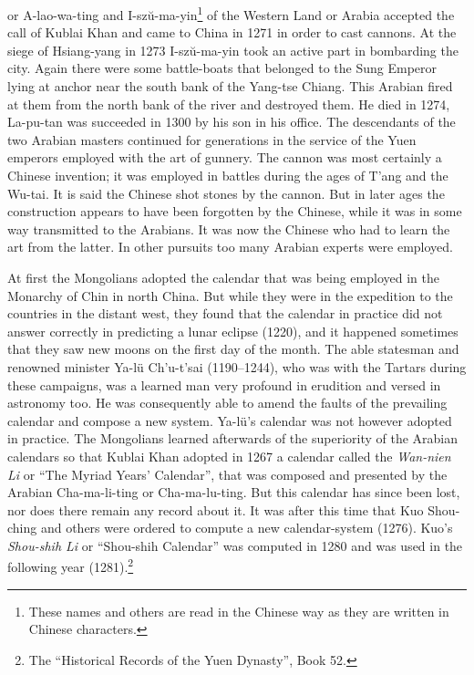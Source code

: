 \documentclass[11pt]{article}
\newcommand{\scanpage}[2]{\clearpage\setcounter{footnote}{0}\noindent{\footnotesize\color{gray}PDF page #1 · #2}\par\medskip}
\begin{document}
\scanpage{0114}{Chapter 15, printed page 100}
\setcounter{footnote}{0}
or A-lao-wa-ting and I-szŭ-ma-yin\footnote{These names and others are read in the Chinese way as they are written in Chinese characters.} of the Western Land or Arabia accepted the call of Kublai Khan and came to China in 1271 in order to cast cannons. At the siege of Hsiang-yang in 1273 I-szŭ-ma-yin took an active part in bombarding the city. Again there were some battle-boats that belonged to the Sung Emperor lying at anchor near the south bank of the Yang-tse Chiang. This Arabian fired at them from the north bank of the river and destroyed them. He died in 1274, La-pu-tan was succeeded in 1300 by his son in his office. The descendants of the two Arabian masters continued for generations in the service of the Yuen emperors employed with the art of gunnery. The cannon was most certainly a Chinese invention; it was employed in battles during the ages of T'ang and the Wu-tai. It is said the Chinese shot stones by the cannon. But in later ages the construction appears to have been forgotten by the Chinese, while it was in some way transmitted to the Arabians. It was now the Chinese who had to learn the art from the latter. In other pursuits too many Arabian experts were employed.

At first the Mongolians adopted the calendar that was being employed in the Monarchy of Chin in north China. But while they were in the expedition to the countries in the distant west, they found that the calendar in practice did not answer correctly in predicting a lunar eclipse (1220), and it happened sometimes that they saw new moons on the first day of the month. The able statesman and renowned minister Ya-lü Ch'u-t'sai (1190--1244), who was with the Tartars during these campaigns, was a learned man very profound in erudition and versed in astronomy too. He was consequently able to amend the faults of the prevailing calendar and compose a new system. Ya-lü's calendar was not however adopted in practice. The Mongolians learned afterwards of the superiority of the Arabian calendars so that Kublai Khan adopted in 1267 a calendar called the \emph{Wan-nien Li} or ``The Myriad Years' Calendar'', that was composed and presented by the Arabian Cha-ma-li-ting or Cha-ma-lu-ting. But this calendar has since been lost, nor does there remain any record about it. It was after this time that Kuo Shou-ching and others were ordered to compute a new calendar-system (1276). Kuo's \emph{Shou-shih Li} or ``Shou-shih Calendar'' was computed in 1280 and was used in the following year (1281).\footnote{The ``Historical Records of the Yuen Dynasty'', Book 52.}
\end{document}
